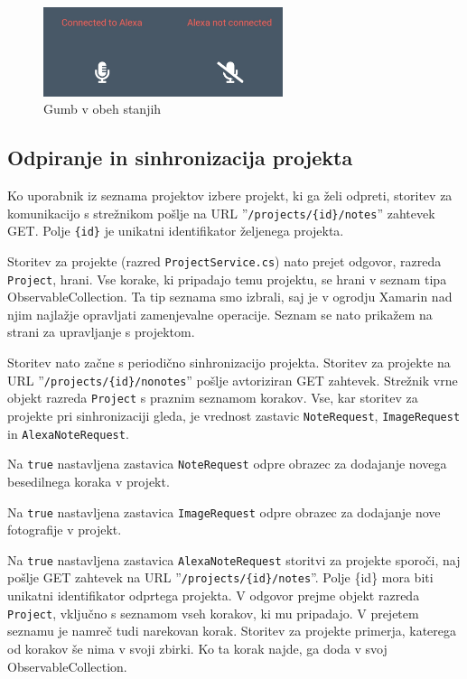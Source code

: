 \documentclass[a4paper, 12pt]{book}
\begin{document}
\begin{figure}[H]
\begin{center}
\includegraphics[width=7cm]{app_alexa_yesno}
\end{center}
	\caption{Gumb v obeh stanjih}
\label{app_alexa_yesno}
\end{figure}

\subsection{Odpiranje in sinhronizacija projekta}

Ko uporabnik iz seznama projektov izbere projekt, ki ga želi odpreti, storitev za komunikacijo s strežnikom pošlje na URL ''\texttt{/projects/\{id\}/notes}'' zahtevek GET.
Polje \texttt{\{id\}} je unikatni identifikator željenega projekta.

Storitev za projekte (razred \texttt{ProjectService.cs}) nato prejet odgovor, razreda \texttt{Project}, hrani.
Vse korake, ki pripadajo temu projektu, se hrani v seznam tipa ObservableCollection.
Ta tip seznama smo izbrali, saj je v ogrodju Xamarin nad njim najlažje opravljati zamenjevalne operacije.
Seznam se nato prikažem na strani za upravljanje s projektom.

Storitev nato začne s periodično sinhronizacijo projekta.
Storitev za projekte na URL ''\texttt{/projects/\{id\}/nonotes}'' pošlje avtoriziran GET zahtevek.
Strežnik vrne objekt razreda \texttt{Project} s praznim seznamom korakov.
Vse, kar storitev za projekte pri sinhronizaciji gleda, je vrednost zastavic \texttt{NoteRequest}, \texttt{ImageRequest} in \texttt{AlexaNoteRequest}.

Na \texttt{true} nastavljena zastavica \texttt{NoteRequest} odpre obrazec za dodajanje novega besedilnega koraka v projekt.

Na \texttt{true} nastavljena zastavica \texttt{ImageRequest} odpre obrazec za dodajanje nove fotografije v projekt.

Na \texttt{true} nastavljena zastavica \texttt{AlexaNoteRequest} storitvi za projekte sporoči, naj pošlje GET zahtevek na URL ''\texttt{/projects/\{id\}/notes}''.
Polje \{id\} mora biti unikatni identifikator odprtega projekta.
V odgovor prejme objekt razreda \texttt{Project}, vključno s seznamom vseh korakov, ki mu pripadajo.
V prejetem seznamu je namreč tudi narekovan korak.
Storitev za projekte primerja, katerega od korakov še nima v svoji zbirki.
Ko ta korak najde, ga doda v svoj ObservableCollection.
\end{document}
